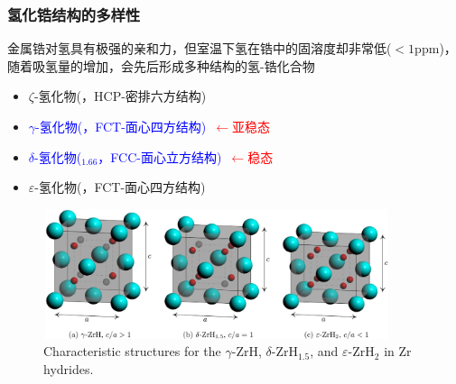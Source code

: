 \begin{frame}
	\frametitle{氢化锆结构的多样性}
金属锆对氢具有极强的亲和力，但室温下氢在锆中的固溶度却非常低\textrm{($<1\mathrm{ppm}$)}，随着吸氢量的增加，会先后形成多种结构的氢-锆化合物
\begin{itemize}
	\item $\zeta$-氢化物\textrm{(，HCP-密排六方结构)}
	\item \textcolor{blue}{$\gamma$-氢化物\textrm{(，FCT-面心四方结构)}}~\textcolor{red}{$\leftarrow$亚稳态}
	\item \textcolor{blue}{$\delta$-氢化物\textrm{($_{1.66}$，FCC-面心立方结构)}}~\textcolor{red}{$\leftarrow$稳态}
	\item $\varepsilon$-氢化物\textrm{(，FCT-面心四方结构)}
\end{itemize}
\begin{figure}[!ht]
\centering
\vspace*{-0.05in}
\includegraphics[height=1.50in,width=4.00in,viewport=0 0 1681 640,clip]{Figures/Characteristic_structures-for-the_ZrH_ZrH1.5_and_ZrH2-in-Zr_hydrides.png}
\caption{\tiny \textrm{Characteristic structures for the $\gamma$-ZrH, $\delta$-$\mathrm{ZrH}_{1.5}$, and $\varepsilon$-$\mathrm{ZrH}_2$ in Zr hydrides.}}
\label{Fig:Characteristic_structures-for-the_𝛾-ZrH_𝛿-ZrH1.5_and_𝜀-ZrH2-in-Zr_hydrides}
\end{figure}
\end{frame}

